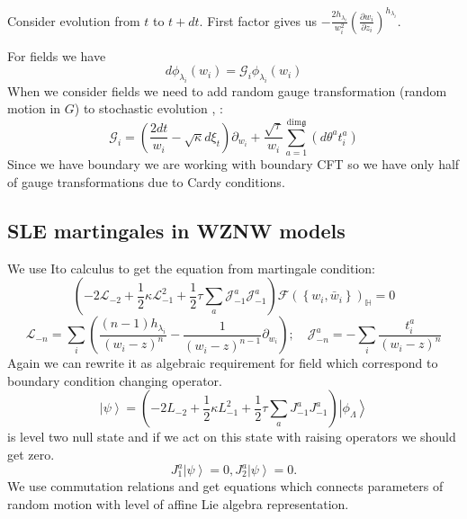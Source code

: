 \documentclass[12pt]{article}
\theoremstyle{definition}
\newcommand{\gf}{\mathfrak{g}}
\theoremstyle{definition} \newtheorem{Def}{Definition}
\begin{document}
Consider evolution from $t$ to $t+dt$.
First factor gives us $-\frac{2h_{\lambda_{i}}}{w_{i}^{2}}\left(\frac{\partial w_{i}}{\partial z_{i}}\right)^{h_{\lambda_{i}}}$.

 For fields we have
\begin{equation*}
  d\phi_{\lambda_{i}}(w_{i}) = \mathcal{G}_{i}\phi_{\lambda_{i}}(w_{i})
\end{equation*}
When we consider fields we need to add random gauge transformation (random motion in $G$) to stochastic evolution \cite{bettelheim2005stochastic}, \cite{alekseev2010sle}:
\begin{equation*}
  \mathcal{G}_{i}=\left(\frac{2dt}{w_{i}}-\sqrt{\kappa} d\xi_{t}\right) \partial_{w_{i}}+\frac{\sqrt{\tau}}{w_{i}}\sum_{a=1}^{\mathrm{dim} \gf}\left(d \theta ^{a} t^{a}_{i}\right)
\end{equation*}
Since we have boundary we are working with boundary CFT so we have only half of gauge transformations due to Cardy conditions.

\subsection{SLE martingales in WZNW models}
We use Ito calculus to get the equation from martingale condition:
\begin{equation*}
  \left(-2 \mathcal{L}_{-2}+\frac{1}{2}\kappa \mathcal{L}_{-1}^{2}+\frac{1}{2}\tau\sum_{a} \mathcal{J}^{a}_{-1} \mathcal{J}^{a}_{-1}\right)        \mathcal{F}(\left\{w_{i}, \bar w_{i}\right\})_{\mathbb{H}}=0
\end{equation*}
\begin{equation*}
  \mathcal{L}_{-n}=\sum_{i}\left(\frac{(n-1)h_{\lambda_{i}}}{(w_{i}-z)^{n}}-\frac{1}{(w_{i}-z)^{n-1}}\partial_{w_{i}}\right);\quad \mathcal{J}^{a}_{{-n}}=-\sum_{i}\frac{t^{a}_{i}}{(w_{i}-z)^{n}}
\end{equation*}
Again we can rewrite it as algebraic requirement for  field  which 
correspond to boundary condition changing operator.
\begin{equation*}
  \left| \psi\right>=\left(-2 L_{-2}+\frac{1}{2}\kappa L_{-1}^{2}+\frac{1}{2}\tau\sum_{a} J^{a}_{-1} J^{a}_{-1}\right) \left|\phi_{\Lambda}\right>    
\end{equation*}
is level two null state and if we act on this state with raising operators we should get zero.
\begin{equation*}
  J^{a}_{1} \left|\psi\right>=0, J^{a}_{2}\left|\psi\right>=0.
\end{equation*}
 We use commutation relations and get equations which connects parameters of random motion with level of affine Lie algebra representation. 
\end{document}
